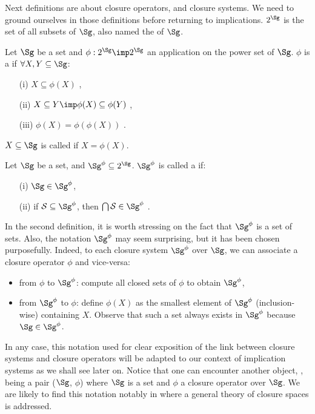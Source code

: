 \vspace{1.2em}

Next definitions are about closure operators, and closure systems. We need 
to ground ourselves in those definitions before returning to implications.
$2^{\Sg}$ is the set of all subsets of $\Sg$, also named the 
of $\Sg$.

\begin{definition} Let $\Sg$ be a set and $\phi : 
	2^{\Sg} \imp 2^{\Sg}$ an application on the power set of $\Sg$. $\phi$ is
	a  if $\forall X, Y \subseteq \Sg$:
	\begin{itemize}
		\item[(i)] $X \subseteq \phi(X)$ ,
		\item[(ii)] $X \subseteq Y \imp \phi(X) \subseteq \phi(Y)$
		,
		\item[(iii)] $\phi(X) = \phi(\phi(X))$ .
	\end{itemize}
	$X \subseteq \Sg$ is called  if $X = \phi(X)$.
\end{definition}

\begin{definition} Let $\Sg$ be a set, and $\Sg^{\phi}
	\subseteq 2^{\Sg}$. $\Sg^{\phi}$ is called a  if:
	\begin{itemize}
		\item[(i)] $\Sg \in \Sg^{\phi}$,
		\item[(ii)] if $\cal{S} \subseteq \Sg^{\phi}$, then $\bigcap \cal{S} 
		\in 
		\Sg^{\phi}$ \quad {}.
	\end{itemize}
	
\end{definition}

\noindent In the second definition, it is worth stressing on the fact that
$\Sg^{\phi}$ is a set of sets. Also, the notation $\Sg^{\phi}$ may seem 
surprising, but it has been chosen purposefully. Indeed, to each closure system
$\Sg^{\phi}$ over $\Sg$, we can associate a closure operator $\phi$ and 
vice-versa:
\begin{itemize}
	\item from $\phi$ to $\Sg^{\phi}$: compute all closed sets of $\phi$ to
	obtain $\Sg^{\phi}$,
	\item from $\Sg^{\phi}$ to $\phi$: define $\phi(X)$ as the smallest element
	of $\Sg^{\phi}$ (inclusion-wise) containing $X$. Observe that such a set
	always exists in $\Sg^{\phi}$ because $\Sg \in \Sg^{\phi}$.
\end{itemize}
 In any case, this notation used for clear exposition of the link
between closure systems and closure operators will be adapted to our context
of implication systems as we shall see later on. Notice that one can encounter 
another object, , being a pair ($\Sg$, $\phi$) where
$\Sg$ is a set and $\phi$ a closure operator over $\Sg$. We are likely to find
this notation notably in \cite{wild_implicational_1989, 
	wild_theory_1994} where a general theory of closure spaces is addressed.

